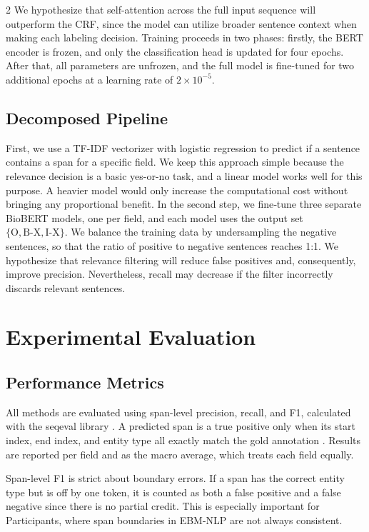\documentclass[11pt]{article}
\begin{document}
\begin{multicols}{2}
We hypothesize that self-attention across the full input sequence will outperform the CRF, since the model can utilize broader sentence context when making each labeling decision. Training proceeds in two phases: firstly, the BERT encoder is frozen, and only the classification head is updated for four epochs. After that, all parameters are unfrozen, and the full model is fine-tuned for two additional epochs at a learning rate of $2 \times 10^{-5}$.

\subsection{Decomposed Pipeline}
First, we use a TF-IDF vectorizer with logistic regression to predict if a sentence contains a span for a specific field. We keep this approach simple because the relevance decision is a basic yes-or-no task, and a linear model works well for this purpose. A heavier model would only increase the computational cost without bringing any proportional benefit. In the second step, we fine‑tune three separate BioBERT models, one per field, and each model uses the output set $\{\text{O}, \text{B-X}, \text{I-X}\}$. We balance the training data by undersampling the negative sentences, so that the ratio of positive to negative sentences reaches 1:1. We hypothesize that relevance filtering will reduce false positives and, consequently, improve precision. Nevertheless, recall may decrease if the filter incorrectly discards relevant sentences.

\section{Experimental Evaluation}
\subsection{Performance Metrics}

All methods are evaluated using span-level precision, recall, and F1, calculated with the seqeval library \cite{nakayama2018seqeval}. A predicted span is a true positive only when its start index, end index, and entity type all exactly match the gold annotation \cite{nye2018corpus}. Results are reported per field and as the macro average, which treats each field equally.

Span-level F1 is strict about boundary errors. If a span has the correct entity type but is off by one token, it is counted as both a false positive and a false negative since there is no partial credit. This is especially important for Participants, where span boundaries in EBM-NLP are not always consistent.


\end{multicols}
\end{document}
